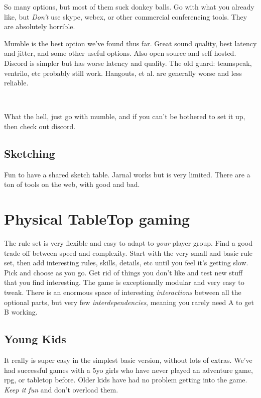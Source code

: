 So many options, but most of them suck donkey balls. Go with what you already like, but \emph{Don't} use skype, webex, or other commercial conferencing tools. They are absolutely horrible.

Mumble is the best option we've found thus far. Great sound quality, best latency and jitter, and some other useful options. Also open source and self hosted. Discord is simpler but has worse latency and quality. The old guard: teamspeak, ventrilo, etc probably still work. Hangouts, et al. are generally worse and less reliable.

\

What the hell, just go with mumble, and if you can't be bothered to set it up, then check out discord.


\subsection*{Sketching} Fun to have a shared sketch table. Jarnal works but is very limited. There are a ton of tools on the web, with good and bad.




\clearpage %

\section*{Physical TableTop gaming}

The rule set is very flexible and easy to adapt to \emph{your} player group. Find a good trade off between speed and complexity. Start with the very small and basic rule set, then add interesting rules, skills, details, etc until you feel it's getting slow. Pick and choose as you go. Get rid of things you don't like and test new stuff that you find interesting. The game is exceptionally modular and very easy to tweak. There is an enormous space of interesting \emph{interactions} between all the optional parts, but very few \emph{interdependencies}, meaning you rarely need A to get B working.


\subsection*{Young Kids} 

It really is super easy in the simplest basic version, without lots of extras. We've had successful games with a 5yo girls who have never played an adventure game, rpg, or tabletop before. Older kids have had no problem getting into the game. \emph{Keep it fun} and don't overload them.

